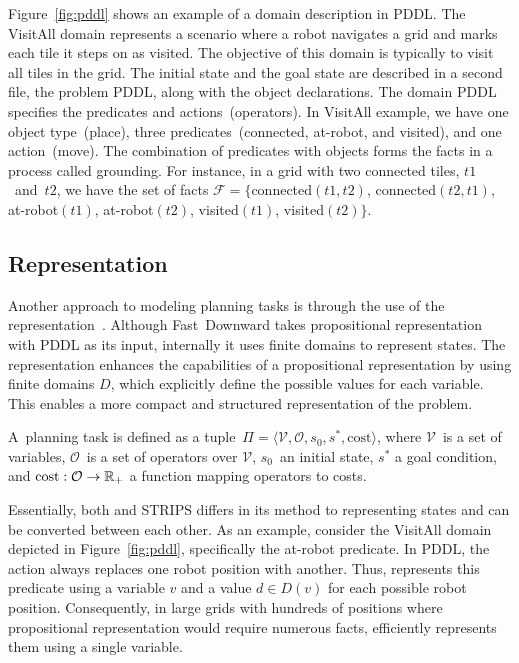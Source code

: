Figure~\ref{fig:pddl} shows an example of a domain description in PDDL. The VisitAll domain represents a scenario where a robot navigates a grid and marks each tile it steps on as visited. The objective of this domain is typically to visit all tiles in the grid. The initial state and the goal state are described in a second file, the problem PDDL, along with the object declarations. The domain PDDL specifies the predicates and actions~(operators). In VisitAll example, we have one object type~(place), three predicates~(connected, at-robot, and visited), and one action~(move). The combination of predicates with objects forms the facts in a process called grounding. For instance, in a grid with two connected tiles, $t1$~and~$t2$, we have the set of facts $\mathcal{F}=\{$connected$(t1,t2)$, \mbox{connected$(t2,t1)$}, \mbox{at-robot$(t1)$}, \mbox{at-robot$(t2)$}, \mbox{visited$(t1)$}, visited$(t2)\}$.

\subsection{\sas Representation}
\label{sec:background_sas}

Another approach to modeling planning tasks is through the use of the \sas representation~\cite{Backstrom.Nebel/1995}. Although Fast~Downward takes propositional representation with PDDL as its input, internally it uses finite domains to represent states. The \sas representation enhances the capabilities of a propositional representation by using finite domains $D$, which explicitly define the possible values for each variable. This enables a more compact and structured representation of the problem.

\begin{definition}\label{def:sasplanningtask}
    A~\sas planning task is defined as a tuple~$\Pi=\langle\mathcal{V},\mathcal{O},s_0,s^*, \text{cost}\rangle$, where $\mathcal{V}$~is a set of variables, $\mathcal{O}$~is a set of operators over $\mathcal{V}$, $s_0$~an initial state, $s^*$ a goal condition, and $\text{cost}:\mathcal{O}\rightarrow\mathbb{R}_{+}$ a function mapping operators to costs.
\end{definition}

Essentially, both \sas and STRIPS differs in its method to representing states and can be converted between each other. As an example, consider the VisitAll domain depicted in Figure~\ref{fig:pddl}, specifically the at-robot predicate. In PDDL, the action always replaces one robot position with another. Thus, \sas represents this predicate using a variable $v$ and a value $d \in D(v)$ for each possible robot position. Consequently, in large grids with hundreds of positions where propositional representation would require numerous facts, \sas efficiently represents them using a single variable.

